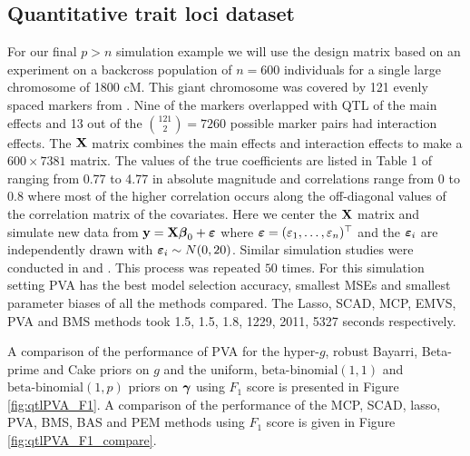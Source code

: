 \subsection{Quantitative trait loci dataset}
\label{sec:QTL}

    For our final $p>n$ simulation example we will use the design matrix based
    on an experiment on a backcross population of $n=600$ individuals for a
    single large chromosome of 1800 cM. This giant chromosome was covered by
    121 evenly spaced markers from \cite{Xu2007}. Nine of the markers
    overlapped with QTL of the main effects and 13 out of the ${121 \choose 2}
    = 7260$ possible marker pairs had interaction effects. The ${\bf X}$ matrix
    combines the main effects and interaction effects to make a $600\times
    7381$ matrix. The values of the true coefficients are listed in Table 1 of
    \cite{Xu2007} ranging from 0.77 to 4.77 in absolute magnitude and
    correlations range from 0 to 0.8 where most of the higher correlation
    occurs along the off-diagonal values of the correlation matrix of the
    covariates. Here we center the ${\bf X}$ matrix and simulate new data from ${\bf y}
    = {\bf X}{\boldsymbol \beta}_0 + {\boldsymbol \varepsilon}$ where ${\boldsymbol \varepsilon} =
    (\varepsilon_1,\ldots,\varepsilon_n)^\top$ and the ${\boldsymbol \varepsilon}_i$ are
    independently drawn with ${\boldsymbol \varepsilon}_i \sim N(0,20)$. Similar simulation
    studies were conducted in \cite{Xu2007} and \cite{Karkkainen2012}. This
    process was repeated $50$ times.  For this simulation setting PVA has the
    best model selection accuracy, smallest MSEs and smallest parameter biases
    of all the methods compared.  The Lasso, SCAD, MCP, EMVS, PVA and BMS
    methods took 1.5, 1.5, 1.8, 1229, 2011, 5327 seconds respectively.

A comparison of the performance of PVA for the hyper-$g$, robust Bayarri,
Beta-prime and Cake priors on $g$ and the uniform, $\text{beta-binomial}(1, 1)$
and \\ $\text{beta-binomial}(1, p)$ priors on ${\boldsymbol \gamma}$ using $F_1$ score is
presented in Figure \ref{fig:qtlPVA_F1}. A comparison of the performance of the
MCP, SCAD, lasso, PVA, BMS, BAS and PEM  methods using $F_1$ score is given in
Figure \ref{fig:qtlPVA_F1_compare}.

